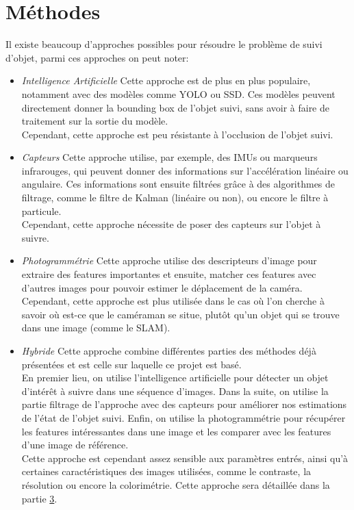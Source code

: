 \section{Méthodes}
Il existe beaucoup d'approches possibles pour résoudre le problème de suivi d'objet, parmi ces approches on peut noter:\\
\begin{itemize}
	\item \textit{Intelligence Artificielle}\newline
	Cette approche est de plus en plus populaire, notamment avec des modèles comme YOLO\cite{redmon_you_2016} ou SSD\cite{liu_ssd_2016}. Ces modèles peuvent directement donner la bounding box de l'objet suivi, sans avoir à faire de traitement sur la sortie du modèle.\\
	Cependant, cette approche est peu résistante à l'occlusion de l'objet suivi.\\
	
	\item \textit{Capteurs}\newline
	Cette approche utilise, par exemple, des IMUs ou marqueurs infrarouges, qui peuvent donner des informations sur l'accélération linéaire ou angulaire. Ces informations sont ensuite filtrées grâce à des algorithmes de filtrage, comme le filtre de Kalman (linéaire ou non), ou encore le filtre à particule.\\
	Cependant, cette approche nécessite de poser des capteurs sur l'objet à suivre.\\
	
	\item \textit{Photogrammétrie}\newline
	Cette approche utilise des descripteurs d'image pour extraire des features importantes et ensuite, matcher ces features avec d'autres images pour pouvoir estimer le déplacement de la caméra.\\
	Cependant, cette approche est plus utilisée dans le cas où l'on cherche à savoir où est-ce que le caméraman se situe, plutôt qu'un objet qui se trouve dans une image (comme le SLAM).\\
	
	\item \textit{Hybride}\newline
	Cette approche combine différentes parties des méthodes déjà présentées et est celle sur laquelle ce projet est basé.\\
	En premier lieu, on utilise l'intelligence artificielle pour détecter un objet d'intérêt à suivre dans une séquence d'images. Dans la suite, on utilise la partie filtrage de l'approche avec des capteurs pour améliorer nos estimations de l'état de l'objet suivi. Enfin, on utilise la photogrammétrie pour récupérer les features intéressantes dans une image et les comparer avec les features d'une image de référence.\\
	Cette approche est cependant assez sensible aux paramètres entrés, ainsi qu'à certaines caractéristiques des images utilisées, comme le contraste, la résolution ou encore la colorimétrie.
	Cette approche sera détaillée dans la partie \hyperlink{chapter.3}{3}.\\
\end{itemize}
